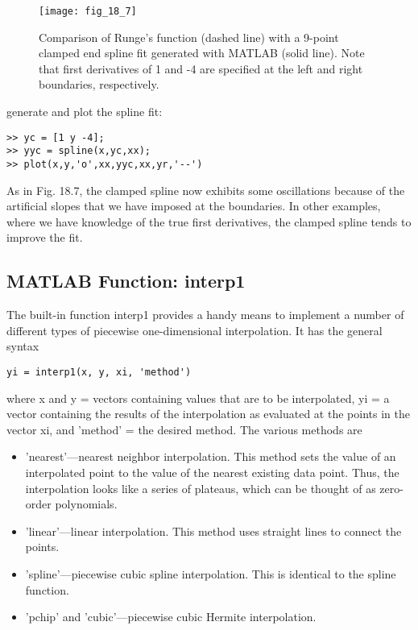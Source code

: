 \documentclass[../main.tex]{subfiles}
\begin{document}
\begin{exmp}
\begin{figure}[H]
    \centering
    \texttt{[image: fig\_18\_7]}
   \caption{\textsf{Comparison of Runge's function (dashed line) with a 9-point clamped end spline fit generated
   with MATLAB (solid line). Note that first derivatives of 1 and -4 are specified at the left and
   right boundaries, respectively.}}\label{fig:fig_18_7}
\end{figure}
generate and plot the spline fit:

\begin{lstlisting}[numbers=none]
>> yc = [1 y -4];
>> yyc = spline(x,yc,xx);
>> plot(x,y,'o',xx,yyc,xx,yr,'--')
\end{lstlisting}
As in Fig. 18.7, the clamped spline now exhibits some oscillations because of the artificial
slopes that we have imposed at the boundaries. In other examples, where we have knowledge of the true first derivatives, the clamped spline tends to improve the fit.

\end{exmp}

\subsection{MATLAB Function: interp1}
The built-in function interp1 provides a handy means to implement a number of different types of piecewise one-dimensional interpolation. It has the general syntax

\begin{lstlisting}[numbers=none]
yi = interp1(x, y, xi, 'method')
\end{lstlisting}

where x and y = vectors containing values that are to be interpolated, yi = a vector containing the results of the interpolation as evaluated at the points in the vector xi, and
'method' = the desired method. The various methods are

\begin{itemize}
    \item 'nearest'—nearest neighbor interpolation. This method sets the value of an interpolated point to the value of the nearest existing data point. Thus, the interpolation
    looks like a series of plateaus, which can be thought of as zero-order polynomials.
    \item 'linear'—linear interpolation. This method uses straight lines to connect the points.
    \item 'spline'—piecewise cubic spline interpolation. This is identical to the spline
    function.
    \item 'pchip' and 'cubic'—piecewise cubic Hermite interpolation.
\end{itemize}
\end{document}
